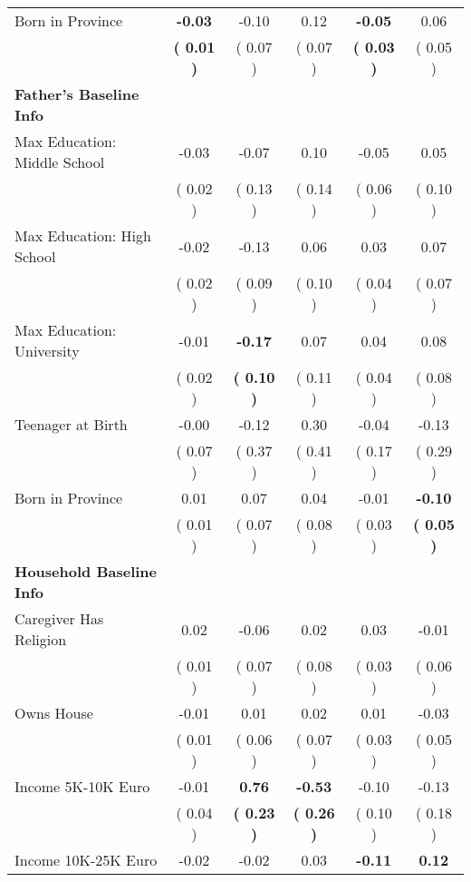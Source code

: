 \begin{table}[H]
{\begin{tabular}{lccccc}
\quad Born in Province & \textbf{    -0.03} &     -0.10 &      0.12 & \textbf{    -0.05} &      0.06 \\
\quad  & \textbf{(     0.01 )} & (     0.07 )  & (     0.07 )  & \textbf{(     0.03 )} & (     0.05 ) \\
\midrule
\textbf{Father's Baseline Info} \\
\quad Max Education: Middle School &     -0.03 &     -0.07 &      0.10 &     -0.05 &      0.05 \\
\quad  & (     0.02 ) & (     0.13 )  & (     0.14 )  & (     0.06 ) & (     0.10 ) \\
\quad Max Education: High School &     -0.02 &     -0.13 &      0.06 &      0.03 &      0.07 \\
\quad  & (     0.02 ) & (     0.09 )  & (     0.10 )  & (     0.04 ) & (     0.07 ) \\
\quad Max Education: University &     -0.01 & \textbf{    -0.17} &      0.07 &      0.04 &      0.08 \\
\quad  & (     0.02 ) & \textbf{(     0.10 )}  & (     0.11 )  & (     0.04 ) & (     0.08 ) \\
\quad Teenager at Birth &     -0.00 &     -0.12 &      0.30 &     -0.04 &     -0.13 \\
\quad  & (     0.07 ) & (     0.37 )  & (     0.41 )  & (     0.17 ) & (     0.29 ) \\
\quad Born in Province &      0.01 &      0.07 &      0.04 &     -0.01 & \textbf{    -0.10} \\
\quad  & (     0.01 ) & (     0.07 )  & (     0.08 )  & (     0.03 ) & \textbf{(     0.05 )} \\
\midrule
\textbf{Household Baseline Info} \\
\quad Caregiver Has Religion &      0.02 &     -0.06 &      0.02 &      0.03 &     -0.01 \\
\quad  & (     0.01 ) & (     0.07 )  & (     0.08 )  & (     0.03 ) & (     0.06 ) \\
\quad Owns House &     -0.01 &      0.01 &      0.02 &      0.01 &     -0.03 \\
\quad  & (     0.01 ) & (     0.06 )  & (     0.07 )  & (     0.03 ) & (     0.05 ) \\
\quad Income 5K-10K Euro &     -0.01 & \textbf{     0.76} & \textbf{    -0.53} &     -0.10 &     -0.13 \\
\quad  & (     0.04 ) & \textbf{(     0.23 )}  & \textbf{(     0.26 )}  & (     0.10 ) & (     0.18 ) \\
\quad Income 10K-25K Euro &     -0.02 &     -0.02 &      0.03 & \textbf{    -0.11} & \textbf{     0.12} \\

\end{tabular}}
\end{table}
